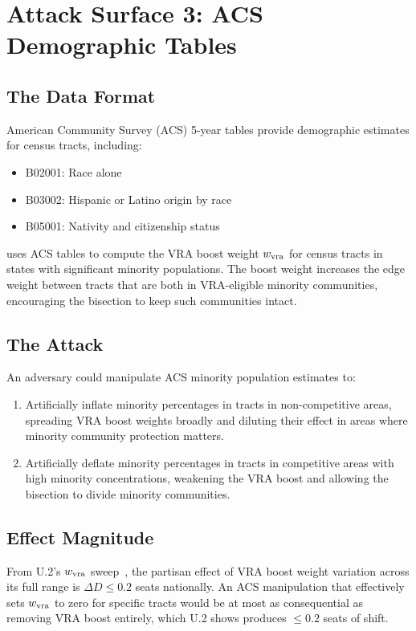 \section{Attack Surface 3: ACS Demographic Tables}
\label{sec:acs}

\subsection{The Data Format}

American Community Survey (ACS) 5-year tables provide demographic
estimates for census tracts, including:
\begin{itemize}
\item B02001: Race alone
\item B03002: Hispanic or Latino origin by race
\item B05001: Nativity and citizenship status
\end{itemize}

\bisect{} uses ACS tables to compute the VRA boost weight $w_{\rm vra}$
for census tracts in states with significant minority populations.
The boost weight increases the edge weight between tracts that are both
in VRA-eligible minority communities, encouraging the bisection to keep
such communities intact.

\subsection{The Attack}

An adversary could manipulate ACS minority population estimates to:
\begin{enumerate}
\item Artificially inflate minority percentages in tracts in non-competitive
  areas, spreading VRA boost weights broadly and diluting their effect
  in areas where minority community protection matters.
\item Artificially deflate minority percentages in tracts in competitive
  areas with high minority concentrations, weakening the VRA boost and
  allowing the bisection to divide minority communities.
\end{enumerate}

\subsection{Effect Magnitude}

From U.2's $w_{\rm vra}$ sweep~\citep{b17paper}, the partisan effect
of VRA boost weight variation across its full range is $\Delta D \leq 0.2$
seats nationally.
An ACS manipulation that effectively sets $w_{\rm vra}$ to zero for
specific tracts would be at most as consequential as removing VRA boost
entirely, which U.2 shows produces $\leq 0.2$ seats of shift.

